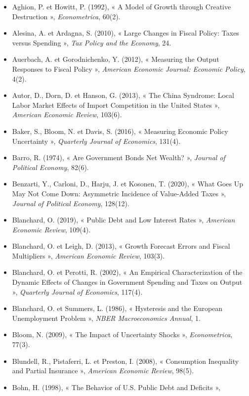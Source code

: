 \documentclass[
  11pt,
  11pt,
  a4paper,
  openany]{book}
\providecommand{\tightlist}{%
  \setlength{\itemsep}{0pt}\setlength{\parskip}{0pt}}
\begin{document}
\begin{itemize}
\tightlist
\item
  Aghion, P. et Howitt, P. (1992), « A Model of Growth through Creative
  Destruction », \emph{Econometrica}, 60(2).
\item
  Alesina, A. et Ardagna, S. (2010), « Large Changes in Fiscal Policy:
  Taxes versus Spending », \emph{Tax Policy and the Economy}, 24.
\item
  Auerbach, A. et Gorodnichenko, Y. (2012), « Measuring the Output
  Responses to Fiscal Policy », \emph{American Economic Journal:
  Economic Policy}, 4(2).
\item
  Autor, D., Dorn, D. et Hanson, G. (2013), « The China Syndrome: Local
  Labor Market Effects of Import Competition in the United States »,
  \emph{American Economic Review}, 103(6).
\item
  Baker, S., Bloom, N. et Davis, S. (2016), « Measuring Economic Policy
  Uncertainty », \emph{Quarterly Journal of Economics}, 131(4).
\item
  Barro, R. (1974), « Are Government Bonds Net Wealth? », \emph{Journal
  of Political Economy}, 82(6).
\item
  Benzarti, Y., Carloni, D., Harju, J. et Kosonen, T. (2020), « What
  Goes Up May Not Come Down: Asymmetric Incidence of Value-Added Taxes
  », \emph{Journal of Political Economy}, 128(12).
\item
  Blanchard, O. (2019), « Public Debt and Low Interest Rates »,
  \emph{American Economic Review}, 109(4).
\item
  Blanchard, O. et Leigh, D. (2013), « Growth Forecast Errors and Fiscal
  Multipliers », \emph{American Economic Review}, 103(3).
\item
  Blanchard, O. et Perotti, R. (2002), « An Empirical Characterization
  of the Dynamic Effects of Changes in Government Spending and Taxes on
  Output », \emph{Quarterly Journal of Economics}, 117(4).
\item
  Blanchard, O. et Summers, L. (1986), « Hysteresis and the European
  Unemployment Problem », \emph{NBER Macroeconomics Annual}, 1.
\item
  Bloom, N. (2009), « The Impact of Uncertainty Shocks »,
  \emph{Econometrica}, 77(3).
\item
  Blundell, R., Pistaferri, L. et Preston, I. (2008), « Consumption
  Inequality and Partial Insurance », \emph{American Economic Review},
  98(5).
\item
  Bohn, H. (1998), « The Behavior of U.S. Public Debt and Deficits »,

\end{itemize}
\end{document}
